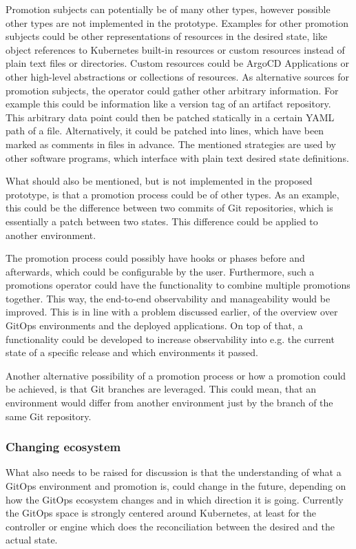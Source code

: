 Promotion subjects can potentially be of many other types, however possible other types are not implemented in the prototype.
Examples for other promotion subjects could be other representations of resources in the desired state,
like object references to Kubernetes built-in resources or custom resources instead of plain text files or directories.
Custom resources could be ArgoCD Applications or other high-level abstractions or collections of resources.
As alternative sources for promotion subjects,
the operator could gather other arbitrary information. For example this could be information like a version tag
of an artifact repository.
This arbitrary data point could then be patched statically in a certain YAML path of a file.
Alternatively, it could be patched into lines, which have been marked as comments in files in advance.
The mentioned strategies are used by other software programs, which interface with plain text desired state definitions.

What should also be mentioned, but is not implemented in the proposed prototype,
is that a promotion process could be of other types.
As an example, this could be the difference between two commits of Git repositories,
which is essentially a patch between two states. This difference could be applied to another environment.

The promotion process could possibly have hooks or phases before and afterwards, which could be configurable by the user.
Furthermore, such a promotions operator could have the functionality to combine multiple promotions together.
This way, the end-to-end observability and manageability would be improved.
This is in line with a problem discussed earlier, of the overview over GitOps environments
and the deployed applications. On top of that, a functionality could be developed
to increase observability into e.g. the current state of a specific release and which environments it passed.

Another alternative possibility of a promotion process or how a promotion could be achieved,
is that Git branches are leveraged.
This could mean, that an environment would differ from another environment just by the branch of the same Git repository.

\subsubsection*{Changing ecosystem}

What also needs to be raised for discussion is that
the understanding of what a GitOps environment and promotion is,
could change in the future, depending on how the GitOps ecosystem changes
and in which direction it is going. Currently the GitOps space
is strongly centered around Kubernetes, at least for the controller or engine which does the reconciliation
between the desired and the actual state.

